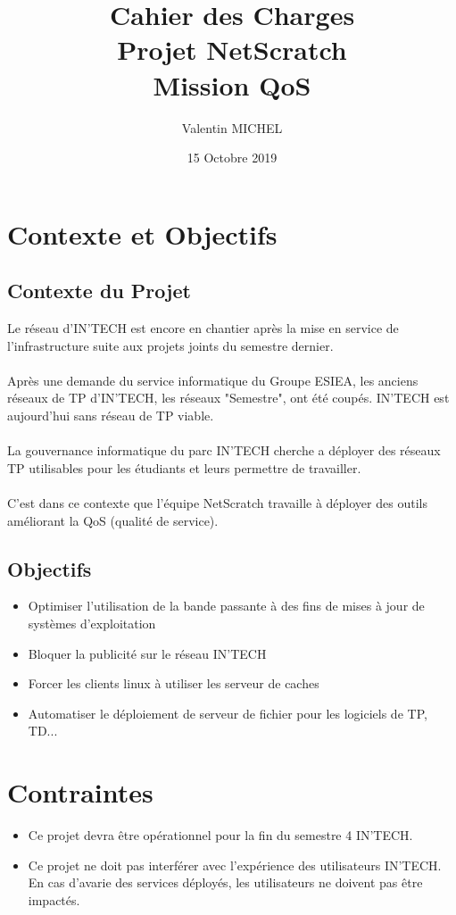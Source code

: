 \documentclass[14pt,a4paper]{extarticle}
\author{Valentin MICHEL}
\date{15 Octobre 2019}
\title{Cahier des Charges \\ Projet NetScratch \\ Mission QoS}
\begin{document}
\maketitle{}
\justify
\break
\tableofcontents
\break
\section{Contexte et Objectifs}
\subsection{Contexte du Projet}
Le réseau d'IN'TECH est encore en chantier après la mise en service de l'infrastructure suite aux projets joints du semestre dernier. \\\\
Après une demande du service informatique du Groupe ESIEA, les anciens réseaux de TP d'IN'TECH, les réseaux "Semestre", ont été coupés. IN'TECH est aujourd'hui sans réseau de TP viable.\\\\
La gouvernance informatique du parc IN'TECH cherche a déployer des réseaux TP utilisables pour les étudiants et leurs permettre de travailler.\\\\
C'est dans ce contexte que l'équipe NetScratch travaille à déployer des outils améliorant la QoS (qualité de service).
\subsection{Objectifs}
\begin{itemize}
    \item{Optimiser l'utilisation de la bande passante à des fins de mises à jour de systèmes d'exploitation}
    \item{Bloquer la publicité sur le réseau IN'TECH}
    \item{Forcer les clients linux à utiliser les serveur de caches}
    \item{Automatiser le déploiement de serveur de fichier pour les logiciels de TP, TD...}
\end{itemize}
\break
\section{Contraintes}
\begin{itemize}
    \item{Ce projet devra être opérationnel pour la fin du semestre 4 IN'TECH.}
    \item{Ce projet ne doit pas interférer avec l'expérience des utilisateurs IN'TECH. En cas d'avarie des services déployés, les utilisateurs ne doivent pas être impactés.}
\end{itemize}
\end{document}
